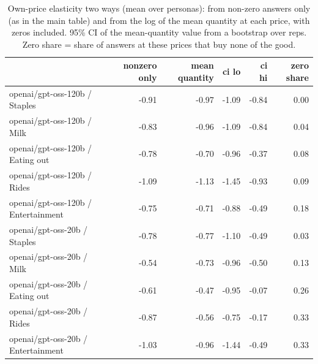 \begin{table}[!htbp]\centering\small
\caption{Own-price elasticity two ways (mean over personas): from non-zero answers only (as in the main table) and from the log of the mean quantity at each price, with zeros included. 95\% CI of the mean-quantity value from a bootstrap over reps. Zero share = share of answers at these prices that buy none of the good.}\label{tab:own_price_mean}
\begin{tabular}{lrrrrr}
\hline
 & nonzero only & mean quantity & ci lo & ci hi & zero share \\ \hline
openai/gpt-oss-120b / Staples & -0.91 & -0.97 & -1.09 & -0.84 & 0.00 \\
openai/gpt-oss-120b / Milk & -0.83 & -0.96 & -1.09 & -0.84 & 0.04 \\
openai/gpt-oss-120b / Eating out & -0.78 & -0.70 & -0.96 & -0.37 & 0.08 \\
openai/gpt-oss-120b / Rides & -1.09 & -1.13 & -1.45 & -0.93 & 0.09 \\
openai/gpt-oss-120b / Entertainment & -0.75 & -0.71 & -0.88 & -0.49 & 0.18 \\
openai/gpt-oss-20b / Staples & -0.78 & -0.77 & -1.10 & -0.49 & 0.03 \\
openai/gpt-oss-20b / Milk & -0.54 & -0.73 & -0.96 & -0.50 & 0.13 \\
openai/gpt-oss-20b / Eating out & -0.61 & -0.47 & -0.95 & -0.07 & 0.26 \\
openai/gpt-oss-20b / Rides & -0.87 & -0.56 & -0.75 & -0.17 & 0.33 \\
openai/gpt-oss-20b / Entertainment & -1.03 & -0.96 & -1.44 & -0.49 & 0.33 \\
\hline
\end{tabular}
\end{table}